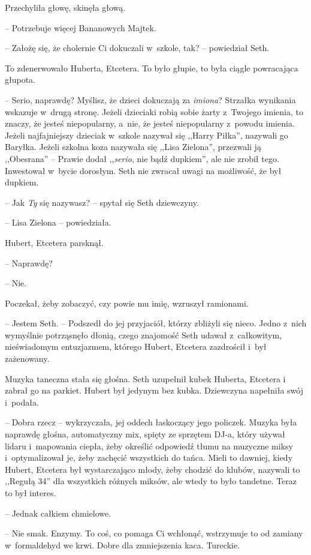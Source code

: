 \documentclass[oneside,polish,11pt,sfheadings]{mwbk}
\begin{document}
Przechyliła głowę, skinęła głową. 

-- Potrzebuje więcej Bananowych Majtek.

-- Założę się, że cholernie Ci dokuczali w~szkole, tak? -- powiedział
Seth.

To zdenerwowało Huberta, Etcetera. To było głupie, to była ciągle
powracająca głupota. 

-- Serio, naprawdę? Myślisz, że dzieci dokuczają za
\textit{imiona}? Strzałka wynikania wskazuje w~drugą stronę. Jeżeli
dzieciaki robią sobie żarty z~Twojego imienia, to znaczy, że jesteś
niepopularny, a~nie, że jesteś niepopularny z~powodu imienia. Jeżeli
najfajniejszy dzieciak w~szkole nazywał się ,,Harry Piłka'', nazywali go
Baryłka. Jeżeli szkolna koza nazywała się ,,Lisa Zielona'', przezwali ją
,,Obesrana'' -- Prawie dodał ,,\textit{serio}, nie bądź dupkiem'', ale nie
zrobił tego. Inwestował w~bycie dorosłym. Seth nie zwracał uwagi na
możliwość, że był dupkiem.

-- Jak \textit{Ty} się nazywasz? -- spytał się Seth dziewczyny.

-- Lisa Zielona -- powiedziała.

Hubert, Etcetera parsknął.

-- Naprawdę?

-- Nie.

Poczekał, żeby zobaczyć, czy powie mu imię, wzruszył ramionami. 

-- Jestem
Seth. -- Podszedł do jej przyjaciół, którzy zbliżyli się nieco. Jedno z~nich wymyślnie potrząsnęło dłonią, czego znajomość Seth udawał z~całkowitym, nieświadomym entuzjazmem, którego Hubert, Etcetera
zazdrościł i~był zażenowany.

Muzyka taneczna stała się głośna. Seth uzupełnił kubek Huberta, Etcetera
i zabrał go na parkiet. Hubert był jedynym bez kubka. Dziewczyna
napełniła swój i~podała.

-- Dobra rzecz -- wykrzyczała, jej oddech łaskoczący jego policzek. Muzyka
była naprawdę głośna, automatyczny mix, spięty ze sprzętem DJ-a, który
używał lidaru i~mapowania ciepła, żeby określić odpowiedź tłumu na
muzyczne miksy i~optymalizował je, żeby zachęcić wszystkich do tańca.
Mieli to dawniej, kiedy Hubert, Etcetera był wystarczająco młody, żeby
chodzić do klubów, nazywali to ,,Regułą 34'' dla wszystkich różnych
miksów, ale wtedy to było tandetne. Teraz to był interes.

-- Jednak całkiem chmielowe.

-- Nie smak. Enzymy. To coś, co pomaga Ci wchłonąć, wstrzymuje to od
zamiany w~formaldehyd we krwi. Dobre dla zmniejszenia kaca. Tureckie.
\end{document}
